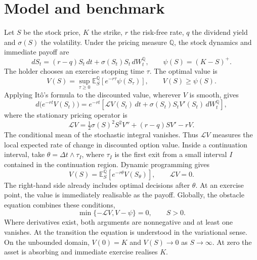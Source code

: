 \documentclass[11pt,a4paper]{article}
\numberwithin{equation}{section}
\begin{document}
\section{Model and benchmark}\label{sec:model}
Let $S$ be the stock price, $K$ the strike, $r$ the risk-free rate,
$q$ the dividend yield and $\sigma(S)$ the volatility. Under the pricing
measure $\mathbb Q$, the stock dynamics and immediate payoff are
\begin{equation}\label{eq:stock}
 dS_t=(r-q)S_t\,dt+\sigma(S_t)S_t\,dW_t^{\mathbb Q},
 \qquad \psi(S)=(K-S)^+.
\end{equation}
The holder chooses an exercise stopping time $\tau$. The optimal value is
\begin{equation}\label{eq:stopping}
 V(S)=\sup_{\tau\ge0}\mathbb E_S^{\mathbb Q}
       \left[e^{-r\tau}\psi(S_\tau)\right],
 \qquad V(S)\ge\psi(S).
\end{equation}
Applying Itô's formula to the discounted value, wherever $V$ is smooth,
gives
\begin{equation}\label{eq:ito}
 d\big(e^{-rt}V(S_t)\big)=e^{-rt}
 \left[\mathcal LV(S_t)\,dt+
       \sigma(S_t)S_t V'(S_t)\,dW_t^{\mathbb Q}\right],
\end{equation}
where the stationary pricing operator is
\begin{equation}\label{eq:operator}
 \mathcal LV=\tfrac12\sigma(S)^2S^2V''+(r-q)SV'-rV.
\end{equation}
The conditional mean of the stochastic integral vanishes. Thus
$\mathcal LV$ measures the local expected rate of change in discounted
option value. Inside a continuation interval, take
$\theta=\Delta t\wedge\tau_I$, where $\tau_I$ is the first exit from a
small interval $I$ contained in the continuation region. Dynamic
programming gives
\begin{equation}\label{eq:dpp}
 V(S)=\mathbb E_S^{\mathbb Q}\left[e^{-r\theta}V(S_\theta)\right],
 \qquad \mathcal LV=0.
\end{equation}
The right-hand side already includes optimal decisions after $\theta$.
At an exercise point, the value is immediately realisable as the payoff.
Globally, the obstacle equation combines these conditions,
\begin{equation}\label{eq:obstacle}
 \min\{-\mathcal LV,V-\psi\}=0,\qquad S>0.
\end{equation}
Where derivatives exist, both arguments are nonnegative and at least one
vanishes. At the transition the equation is understood in the variational
sense. On the unbounded domain, $V(0)=K$ and $V(S)\to0$ as $S\to\infty$.
At zero the asset is absorbing and immediate exercise realises $K$.
\end{document}
